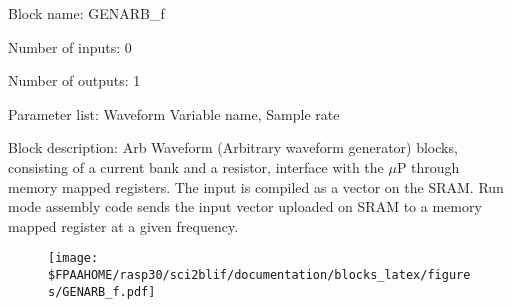 \pagebreak

Block name: GENARB\_f

Number of inputs: 0

Number of outputs: 1

Parameter list: Waveform Variable name, Sample rate

Block description: 
Arb Waveform (Arbitrary waveform generator) blocks, consisting of a current bank and a resistor, interface with the $\mu$P through memory mapped registers. The input is compiled as a vector on the SRAM. Run mode assembly code sends the input vector uploaded on SRAM to a memory mapped register at a given frequency.

\begin{figure}[H]  %
\texttt{[image: \$FPAAHOME/rasp30/sci2blif/documentation/blocks\_latex/figures/GENARB\_f.pdf]}
\end{figure}

